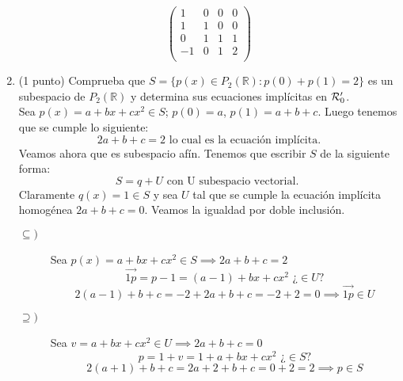 \documentclass[12pt]{article}
\begin{document}
\begin{ejercicio}[2 puntos]
\begin{enumerate}
$$\begin{pmatrix}
                    1 & 0 & 0 & 0 \\
                    1 & 1 & 0 & 0 \\
                    0 & 1 & 1 & 1 \\
                    -1 & 0 & 1 & 2 \\
                \end{pmatrix}$$    
        \item (1 punto) Comprueba que \( S = \{p(x) \in P_2(\mathbb{R}) : p(0)+p(1) = 2\} \) es un subespacio de \( P_2(\mathbb{R}) \) y determina sus ecuaciones implícitas en \( \mathcal{R}_0' \).\\
        Sea $p(x)=a+bx+cx^2\in S$; $p(0) = a$, $p(1) = a+b+c$. Luego tenemos que se cumple lo siguiente: 
        $$2a+b+c = 2 \mbox{ lo cual es la ecuación implícita.}$$
        Veamos ahora que es subespacio afín. Tenemos que escribir $S$ de la siguiente forma:
        $$S=q+U \mbox{ con U subespacio vectorial. }$$
        Claramente $q(x)=1 \in S$ y sea $U$ tal que se cumple la ecuación implícita homogénea $2a+b+c=0$. Veamos la igualdad por doble inclusión. 
        \begin{description}
            \item [$\subseteq )$] Sea $p(x)= a + bx + cx^2 \in S \implies 2a+b+c = 2$ \\
                $$\vec{1p} = p-1 = (a-1)+bx+cx^2 \mbox{ ¿}\in U?$$
               $$2(a-1) + b + c = -2 + 2a + b + c = -2 + 2= 0 \implies \vec{1p}\in U$$ 
            \item [$\supseteq )$] Sea $v= a+bx+cx^2\in U \implies 2a+b+c = 0$
                $$p = 1 + v = 1 + a + bx + cx^2 \mbox{ ¿}\in S?$$
                $$2(a+1) + b  + c = 2a + 2 + b + c = 0 + 2 = 2 \implies p \in S$$
        \end{description}
        \end{enumerate}
        \end{ejercicio}
        
\end{document}
